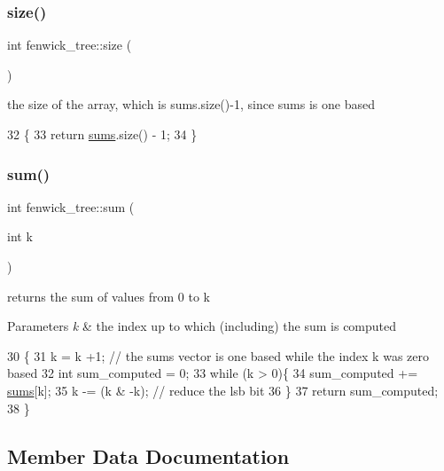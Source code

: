 \subsubsection{\texorpdfstring{size()}{size()}}
{\footnotesize\ttfamily int fenwick\+\_\+tree\+::size (\begin{DoxyParamCaption}{ }\end{DoxyParamCaption})\hspace{0.3cm}{\ttfamily [inline]}}



the size of the array, which is sums.\+size()-\/1, since sums is one based 


\begin{DoxyCode}
32   \{
33     \textcolor{keywordflow}{return} \hyperlink{classfenwick__tree_ac05c8fc17f358a38a2bab242f9164138}{sums}.size() - 1;
34   \}
\end{DoxyCode}
\mbox{\label{classfenwick__tree_adad26fa851d811b4d1e0328a5c6eae03}} 
\subsubsection{\texorpdfstring{sum()}{sum()}}
{\footnotesize\ttfamily int fenwick\+\_\+tree\+::sum (\begin{DoxyParamCaption}\item[{int}]{k }\end{DoxyParamCaption})}

returns the sum of values from 0 to k 
\begin{DoxyParams}{Parameters}
{\em k} & the index up to which (including) the sum is computed \\
\hline
\end{DoxyParams}

\begin{DoxyCode}
30 \{
31   k = k +1; \textcolor{comment}{// the sums vector is one based while the index k was zero based}
32   \textcolor{keywordtype}{int} sum\_computed = 0;
33   \textcolor{keywordflow}{while} (k > 0)\{
34     sum\_computed += \hyperlink{classfenwick__tree_ac05c8fc17f358a38a2bab242f9164138}{sums}[k];
35     k -= (k & -k); \textcolor{comment}{// reduce the lsb bit}
36   \}
37   \textcolor{keywordflow}{return} sum\_computed;
38 \}
\end{DoxyCode}


\subsection{Member Data Documentation}
\mbox{\label{classfenwick__tree_ac05c8fc17f358a38a2bab242f9164138}} 
